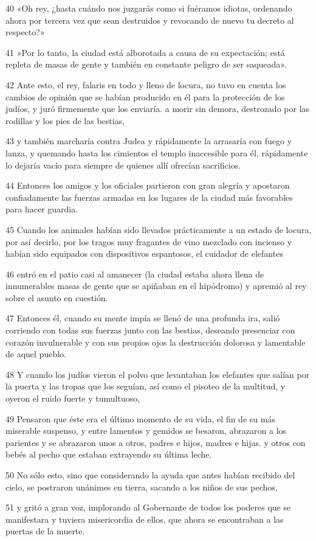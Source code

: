 \par 40 «Oh rey, ¿hasta cuándo nos juzgarás como si fuéramos idiotas, ordenando ahora por tercera vez que sean destruidos y revocando de nuevo tu decreto al respecto?»
\par 41 »Por lo tanto, la ciudad está alborotada a causa de su expectación; está repleta de masas de gente y también en constante peligro de ser saqueada».
\par 42 Ante esto, el rey, falaris en todo y lleno de locura, no tuvo en cuenta los cambios de opinión que se habían producido en él para la protección de los judíos, y juró firmemente que los enviaría. a morir sin demora, destrozado por las rodillas y los pies de las bestias,
\par 43 y también marcharía contra Judea y rápidamente la arrasaría con fuego y lanza, y quemando hasta los cimientos el templo inaccesible para él, rápidamente lo dejaría vacío para siempre de quienes allí ofrecían sacrificios.
\par 44 Entonces los amigos y los oficiales partieron con gran alegría y apostaron confiadamente las fuerzas armadas en los lugares de la ciudad más favorables para hacer guardia.
\par 45 Cuando los animales habían sido llevados prácticamente a un estado de locura, por así decirlo, por los tragos muy fragantes de vino mezclado con incienso y habían sido equipados con dispositivos espantosos, el cuidador de elefantes
\par 46 entró en el patio casi al amanecer (la ciudad estaba ahora llena de innumerables masas de gente que se apiñaban en el hipódromo) y apremió al rey sobre el asunto en cuestión.
\par 47 Entonces él, cuando su mente impía se llenó de una profunda ira, salió corriendo con todas sus fuerzas junto con las bestias, deseando presenciar con corazón invulnerable y con sus propios ojos la destrucción dolorosa y lamentable de aquel pueblo.
\par 48 Y cuando los judíos vieron el polvo que levantaban los elefantes que salían por la puerta y las tropas que los seguían, así como el pisoteo de la multitud, y oyeron el ruido fuerte y tumultuoso,
\par 49 Pensaron que éste era el último momento de su vida, el fin de su más miserable suspenso, y entre lamentos y gemidos se besaron, abrazaron a los parientes y se abrazaron unos a otros, padres e hijos, madres e hijas. y otros con bebés al pecho que estaban extrayendo su última leche.
\par 50 No sólo esto, sino que considerando la ayuda que antes habían recibido del cielo, se postraron unánimes en tierra, sacando a los niños de sus pechos,
\par 51 y gritó a gran voz, implorando al Gobernante de todos los poderes que se manifestara y tuviera misericordia de ellos, que ahora se encontraban a las puertas de la muerte.

